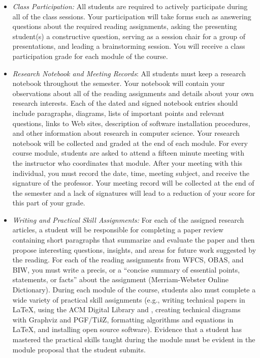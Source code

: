 \begin{itemize}
  
  \itemsep 0em

  \item {\em Class Participation:} All students are required to actively participate during all of the class sessions.
    Your participation will take forms such as answering questions about the required reading assignments, asking the
    presenting student(s) a constructive question, serving as a session chair for a group of presentations, and leading
    a brainstorming session. You will receive a class participation grade for each module of the course.

\item {\em Research Notebook and Meeting Records}: All students must keep a research notebook throughout the semester.
  Your notebook will contain your observations about all of the reading assignments and details about your own research
  interests. Each of the dated and signed notebook entries should include paragraphs, diagrams, lists of important
  points and relevant questions, links to Web sites, description of software installation procedures, and other
  information about research in computer science. Your research notebook will be collected and graded at the end of each
  module. For every course module, students are asked to attend a fifteen minute meeting with the instructor who
  coordinates that module. After your meeting with this individual, you must record the date, time, meeting
  subject, and receive the signature of the professor. Your meeting record will be collected at the end of the semester
  and a lack of signatures will lead to a reduction of your score for this part of your grade.

\item {\em Writing and Practical Skill Assignments:} For each of the assigned research articles, a student will be
  responsible for completing a paper review containing short paragraphs that summarize and evaluate the paper and
  then propose interesting questions, insights, and areas for future work suggested by the reading. For each of the
  reading assignments from WFCS, OBAS, and BIW, you must write a precis, or a ``concise summary of essential points,
  statements, or facts'' about the assignment (Merriam-Webster Online Dictionary). During each module of the course,
  students also must complete a wide variety of practical skill assignments (e.g., writing technical papers in \LaTeX,
  using the ACM Digital Library and \BibTeX, creating technical diagrams with Graphviz and PGF/Ti\emph{k}Z, formatting
  algorithms and equations in \LaTeX, and installing open source software). Evidence that a student has mastered the
  practical skills taught during the module must be evident in the module proposal that the student submits.


\end{itemize}
